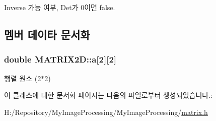 Inverse 가능 여부, Det가 0이면 false. 



\subsection{멤버 데이타 문서화}
\hypertarget{class_m_a_t_r_i_x2_d_a4ae1e61f3b886f9b3ce346f6d54de973}{
\subsubsection[{a}]{\setlength{\rightskip}{0pt plus 5cm}double M\-A\-T\-R\-I\-X2\-D\-::a\mbox{[}2\mbox{]}\mbox{[}2\mbox{]}\hspace{0.3cm}{\ttfamily [private]}}}\label{class_m_a_t_r_i_x2_d_a4ae1e61f3b886f9b3ce346f6d54de973}


행렬 원소 (2$\ast$2) 



이 클래스에 대한 문서화 페이지는 다음의 파일로부터 생성되었습니다.\-:\begin{DoxyCompactItemize}
\item 
H\-:/\-Repository/\-My\-Image\-Processing/\-My\-Image\-Processing/\hyperlink{matrix_8h}{matrix.\-h}\end{DoxyCompactItemize}
